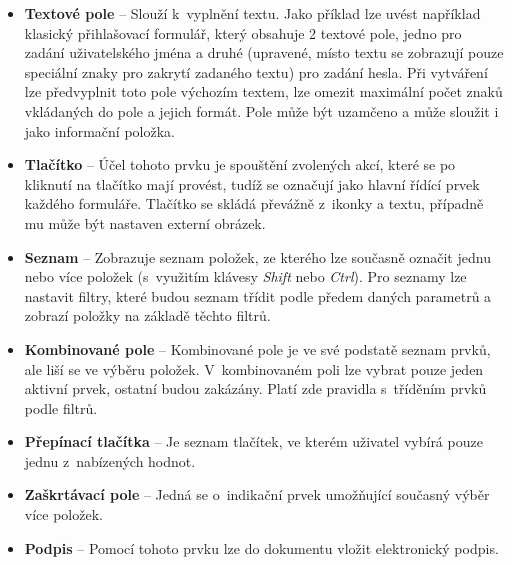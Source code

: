 	\begin{itemize}
	\item \textbf{Textové pole} -- Slouží k~vyplnění textu. Jako příklad lze uvést například klasický přihlašovací formulář, který obsahuje 2 textové pole, jedno pro zadání uživatelského jména a druhé (upravené, místo textu se zobrazují pouze speciální znaky pro zakrytí zadaného textu)  pro zadání hesla. Při vytváření lze předvyplnit toto pole výchozím textem, lze omezit maximální počet znaků vkládaných do pole a jejich formát. Pole může být uzamčeno a může sloužit i jako informační položka.
	\item \textbf{Tlačítko} -- Účel tohoto prvku je spouštění zvolených akcí, které se po kliknutí na tlačítko mají provést, tudíž se označují jako hlavní řídící prvek každého formuláře. Tlačítko se skládá převážně z~ikonky a textu, případně mu může být nastaven externí obrázek.
	\item \textbf{Seznam} -- Zobrazuje seznam položek, ze kterého lze současně označit jednu nebo více položek (s~využitím klávesy \textit{Shift} nebo \textit{Ctrl}). Pro seznamy lze nastavit filtry, které budou seznam třídit podle předem daných parametrů a zobrazí položky na základě těchto filtrů.
	\item \textbf{Kombinované pole} -- Kombinované pole je ve své podstatě seznam prvků, ale liší se ve výběru položek. V~kombinovaném poli lze vybrat pouze jeden aktivní prvek, ostatní budou zakázány. Platí zde pravidla s~tříděním prvků podle filtrů.
	\item \textbf{Přepínací tlačítka} -- Je seznam tlačítek, ve kterém uživatel vybírá pouze jednu z~nabízených hodnot.
	\item \textbf{Zaškrtávací pole} -- Jedná se o~indikační prvek umožňující současný výběr více položek.
	\item \textbf{Podpis} -- Pomocí tohoto prvku lze do dokumentu vložit elektronický podpis.
	\end{itemize}